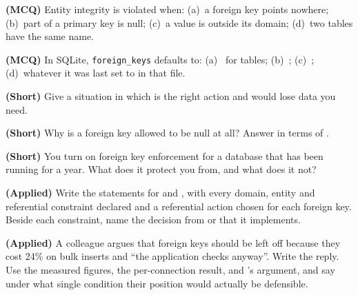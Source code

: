 \begin{reviewq}
  \item \textbf{(MCQ)} Entity integrity is violated when: (a)~a foreign key
        points nowhere; (b)~part of a primary key is null; (c)~a value is
        outside its domain; (d)~two tables have the same name.
  \item \textbf{(MCQ)} In SQLite,  \texttt{foreign\_keys}
        defaults to: (a)~ for  tables;
        (b)~; (c)~; (d)~whatever it was last set to in
        that file.
  \item \textbf{(Short)} Give a situation in which 
        is the right action and  would lose data you need.
  \item \textbf{(Short)} Why is a foreign key allowed to be null at all? Answer
        in terms of .
  \item \textbf{(Short)} You turn on foreign key enforcement for a database
        that has been running for a year. What does it protect you from, and
        what does it not?
  \item \textbf{(Applied)} Write the  statements for
         and , with every domain, entity
        and referential constraint declared and a referential action chosen
        for each foreign key. Beside each constraint, name the decision from
         or  that it implements.
  \item \textbf{(Applied)} A colleague argues that foreign keys should be left
        off because they cost 24\% on bulk inserts and ``the application
        checks anyway''. Write the reply. Use the measured figures, the
        per-connection result, and 's argument, and say
        under what single condition their position would actually be
        defensible.
\end{reviewq}
